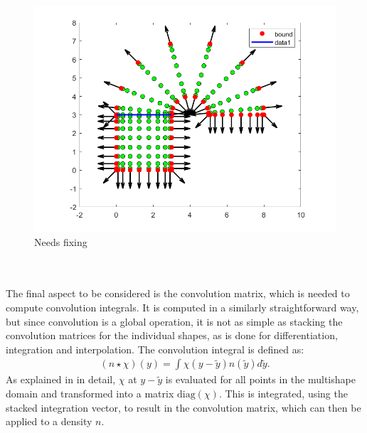 \documentclass[11pt, a4paper]{article}
\theoremstyle{definition}
\begin{document}
	\begin{figure}[h]
		\centering
		\includegraphics[scale=0.5]{normals.png}
		\caption{Needs fixing} 
		\label{F1}
	\end{figure}
\\
\\
The final aspect to be considered is the convolution matrix, which is needed to compute convolution integrals. It is computed in a similarly straightforward way, but since convolution is a global operation, it is not as simple as stacking the convolution matrices for the individual shapes, as is done for differentiation, integration and interpolation. 
The convolution integral is defined as:
\begin{align*}
	\left(n \star \chi \right) (y) = \int \chi (y - \tilde y) n (\tilde y) d \tilde y.
\end{align*}
As explained in \cite{GoddardPseudospectralCode1} in detail, $\chi$ at $y - \tilde y$ is evaluated for all points in the multishape domain and transformed into a matrix $\text{diag} \left(\chi\right)$. This is integrated, using the stacked integration vector, to result in the convolution matrix, which can then be applied to a density $n$.
\end{document}
